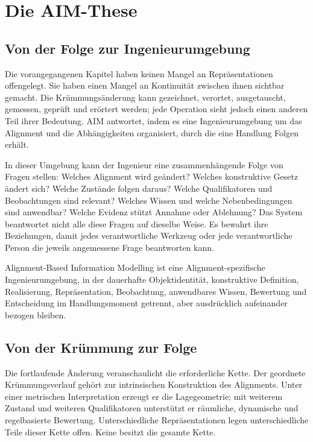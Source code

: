 
\chapter{Die AIM-These}

\section{Von der Folge zur Ingenieurumgebung}

Die vorangegangenen Kapitel haben keinen Mangel an Repräsentationen
offengelegt. Sie haben einen Mangel an Kontinuität zwischen ihnen sichtbar
gemacht. Die Krümmungsänderung kann gezeichnet, verortet, ausgetauscht,
gemessen, geprüft und erörtert werden; jede Operation sieht jedoch einen
anderen Teil ihrer Bedeutung. AIM antwortet, indem es eine Ingenieurumgebung
um das Alignment und die Abhängigkeiten organisiert, durch die eine Handlung
Folgen erhält.

In dieser Umgebung kann der Ingenieur eine zusammenhängende Folge von Fragen
stellen: Welches Alignment wird geändert? Welches konstruktive Gesetz ändert
sich? Welche Zustände folgen daraus? Welche Qualifikatoren und Beobachtungen
sind relevant? Welches Wissen und welche Nebenbedingungen sind anwendbar?
Welche Evidenz stützt Annahme oder Ablehnung? Das System beantwortet nicht alle
diese Fragen auf dieselbe Weise. Es bewahrt ihre Beziehungen, damit jedes
verantwortliche Werkzeug oder jede verantwortliche Person die jeweils
angemessene Frage beantworten kann.

\begin{proposition}
Alignment-Based Information Modelling ist eine Alignment-spezifische
Ingenieurumgebung, in der dauerhafte Objektidentität, konstruktive Definition,
Realisierung, Repräsentation, Beobachtung, anwendbares Wissen, Bewertung und
Entscheidung im Handlungsmoment getrennt, aber ausdrücklich aufeinander bezogen
bleiben.
\end{proposition}

\section{Von der Krümmung zur Folge}

Die fortlaufende Änderung veranschaulicht die erforderliche Kette. Der
geordnete Krümmungsverlauf gehört zur intrinsischen Konstruktion des Alignments.
Unter einer metrischen Interpretation erzeugt er die Lagegeometrie; mit
weiterem Zustand und weiteren Qualifikatoren unterstützt er räumliche,
dynamische und regelbasierte Bewertung. Unterschiedliche Repräsentationen
legen unterschiedliche Teile dieser Kette offen. Keine besitzt die gesamte
Kette.

